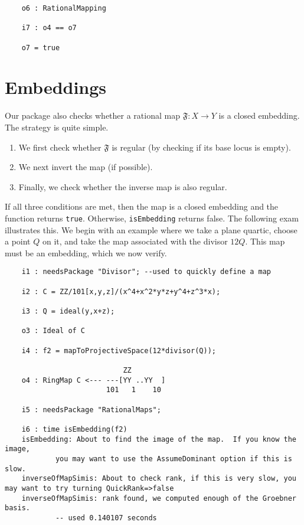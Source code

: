 \documentclass[11pt]{amsart}%
\numberwithin{equation}{theorem}
\renewcommand{\:}{\colon}
\theoremstyle{theorem}
\begin{document}
{{\begin{verbatim}
    o6 : RationalMapping

    i7 : o4 == o7

    o7 = true
\end{verbatim}
}
{\color{black}\normalsize
\section{Embeddings}

Our package also checks whether a rational map $\mathfrak{F} : X \to Y$ is a closed embedding.  The strategy is quite simple.
\begin{enumerate}
\item  We first check whether $\mathfrak{F}$ is regular (by checking if its base locus is empty).
\item  We next invert the map (if possible).
\item  Finally, we check whether the inverse map is also regular.
\end{enumerate}
If all three conditions are met, then the map is a closed embedding and the function returns {\tt true}.  Otherwise, {\tt isEmbedding} returns false.
The following exam illustrates this.  We begin with an example where we take a plane quartic, choose a point $Q$ on it, and take the map associated with 
the divisor $12 Q$.  This map must be an embedding, which we now verify.
}
{\scriptsize
\color{blue}\begin{verbatim}
    i1 : needsPackage "Divisor"; --used to quickly define a map                                           

    i2 : C = ZZ/101[x,y,z]/(x^4+x^2*y*z+y^4+z^3*x);

    i3 : Q = ideal(y,x+z);

    o3 : Ideal of C

    i4 : f2 = mapToProjectiveSpace(12*divisor(Q));

                            ZZ
    o4 : RingMap C <--- ---[YY ..YY  ]                                                                    
                        101   1    10

    i5 : needsPackage "RationalMaps";

    i6 : time isEmbedding(f2)    
    isEmbedding: About to find the image of the map.  If you know the image,
            you may want to use the AssumeDominant option if this is slow.
    inverseOfMapSimis: About to check rank, if this is very slow, you may want to try turning QuickRank=>false
    inverseOfMapSimis: rank found, we computed enough of the Groebner basis.
            -- used 0.140107 seconds                                                                         


\end{verbatim}}}
\end{document}
